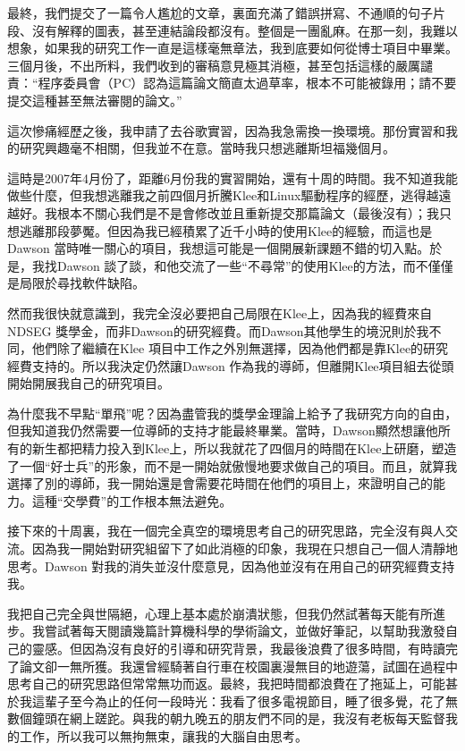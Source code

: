 \documentclass[12pt,UTF8,nofonts]{book}
\begin{document}
最終，我們提交了一篇令人尷尬的文章，裏面充滿了錯誤拼寫、不通順的句子片段、沒有解釋的圖表，甚至連結論段都沒有。整個是一團亂麻。在那一刻，我難以想象，如果我的研究工作一直是這樣毫無章法，我到底要如何從博士項目中畢業。三個月後，不出所料，我們收到的審稿意見極其消極，甚至包括這樣的嚴厲譴責：“程序委員會（PC）認為這篇論文簡直太過草率，根本不可能被錄用；請不要提交這種甚至無法審閱的論文。”

\breakline

這次慘痛經歷之後，我申請了去谷歌實習，因為我急需換一換環境。那份實習和我的研究興趣毫不相關，但我並不在意。當時我只想逃離斯坦福幾個月。

這時是2007年4月份了，距離6月份我的實習開始，還有十周的時間。我不知道我能做些什麼，但我想逃離我之前四個月折騰Klee和Linux驅動程序的經歷，逃得越遠越好。我根本不關心我們是不是會修改並且重新提交那篇論文（最後沒有）；我只想逃離那段夢魘。但因為我已經積累了近千小時的使用Klee的經驗，而這也是Dawson 當時唯一關心的項目，我想這可能是一個開展新課題不錯的切入點。於是，我找Dawson 談了談，和他交流了一些“不尋常”的使用Klee的方法，而不僅僅是局限於尋找軟件缺陷。

然而我很快就意識到，我完全沒必要把自己局限在Klee上，因為我的經費來自NDSEG 獎學金，而非Dawson的研究經費。而Dawson其他學生的境況則於我不同，他們除了繼續在Klee 項目中工作之外別無選擇，因為他們都是靠Klee的研究經費支持的。所以我決定仍然讓Dawson 作為我的導師，但離開Klee項目組去從頭開始開展我自己的研究項目。

為什麼我不早點“單飛”呢？因為盡管我的獎學金理論上給予了我研究方向的自由，但我知道我仍然需要一位導師的支持才能最終畢業。當時，Dawson顯然想讓他所有的新生都把精力投入到Klee上，所以我就花了四個月的時間在Klee上研磨，塑造了一個“好士兵”的形象，而不是一開始就傲慢地要求做自己的項目。而且，就算我選擇了別的導師，我一開始還是會需要花時間在他們的項目上，來證明自己的能力。這種“交學費”的工作根本無法避免。

接下來的十周裏，我在一個完全真空的環境思考自己的研究思路，完全沒有與人交流。因為我一開始對研究組留下了如此消極的印象，我現在只想自己一個人清靜地思考。Dawson 對我的消失並沒什麼意見，因為他並沒有在用自己的研究經費支持我。

我把自己完全與世隔絕，心理上基本處於崩潰狀態，但我仍然試著每天能有所進步。我嘗試著每天閱讀幾篇計算機科學的學術論文，並做好筆記，以幫助我激發自己的靈感。但因為沒有良好的引導和研究背景，我最後浪費了很多時間，有時讀完了論文卻一無所獲。我還曾經騎著自行車在校園裏漫無目的地遊蕩，試圖在過程中思考自己的研究思路但常常無功而返。最終，我把時間都浪費在了拖延上，可能甚於我這輩子至今為止的任何一段時光：我看了很多電視節目，睡了很多覺，花了無數個鐘頭在網上蹉跎。與我的朝九晚五的朋友們不同的是，我沒有老板每天監督我的工作，所以我可以無拘無束，讓我的大腦自由思考。
\end{document}
